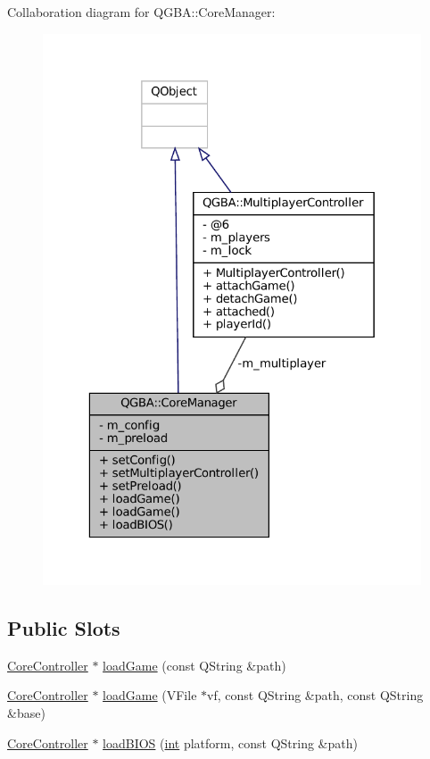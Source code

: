 Collaboration diagram for Q\+G\+BA\+:\+:Core\+Manager\+:
\nopagebreak
\begin{figure}[H]
\begin{center}
\leavevmode
\includegraphics[width=323pt]{class_q_g_b_a_1_1_core_manager__coll__graph}
\end{center}
\end{figure}
\subsection*{Public Slots}
\begin{DoxyCompactItemize}
\item 
\mbox{\hyperlink{class_q_g_b_a_1_1_core_controller}{Core\+Controller}} $\ast$ \mbox{\hyperlink{class_q_g_b_a_1_1_core_manager_af12570d46c37a8f68d574767a7e80350}{load\+Game}} (const Q\+String \&path)
\item 
\mbox{\hyperlink{class_q_g_b_a_1_1_core_controller}{Core\+Controller}} $\ast$ \mbox{\hyperlink{class_q_g_b_a_1_1_core_manager_a1a53511511df13d821ffb60796213865}{load\+Game}} (V\+File $\ast$vf, const Q\+String \&path, const Q\+String \&base)
\item 
\mbox{\hyperlink{class_q_g_b_a_1_1_core_controller}{Core\+Controller}} $\ast$ \mbox{\hyperlink{class_q_g_b_a_1_1_core_manager_a84ddcb6a08e2961de873654fed736470}{load\+B\+I\+OS}} (\mbox{\hyperlink{ioapi_8h_a787fa3cf048117ba7123753c1e74fcd6}{int}} platform, const Q\+String \&path)
\end{DoxyCompactItemize}
